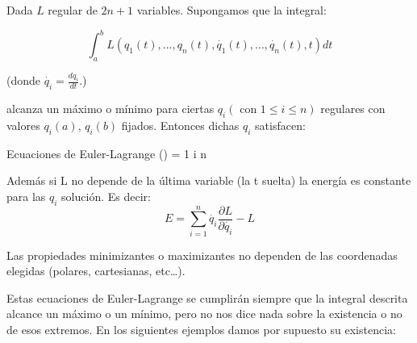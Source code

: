 \begin{prop}
Dada $L$ regular de $2n + 1$ variables. Supongamos que la integral:

 $$\int_a^b L(q_1(t),...,q_n(t),\dot{q_1}(t),...,\dot{q_n}(t),t) dt$$

 (donde $\dot{q_i} = \frac{dq_i}{dt}$.)

 alcanza un máximo o mínimo para ciertas $q_i (\text{ con } 1\leq i \leq n)$ regulares con valores $q_i(a)$, $q_i(b)$ fijados. Entonces dichas $q_i$ satisfacen:


\begin{op}{Ecuaciones de Euler-Lagrange}
	\label{ecuaciones-euler-lagrange}
 \left(\right) =   1 \leq i \leq n
\end{op}

Además si L no depende de la última variable (la t suelta) la energía es constante para las $q_i$ solución. Es decir:
\[E = \sum_{i=1}^n \dot{q_i} \frac{\partial L}{\partial \dot{q_i}} - L\]

Las propiedades minimizantes o maximizantes no dependen de las coordenadas elegidas (polares, cartesianas, etc…).

\end{prop}

Estas ecuaciones de Euler-Lagrange se cumplirán siempre que la integral descrita alcance un máximo o un mínimo, pero no nos dice nada sobre la existencia o no de esos extremos. En los  siguientes ejemplos damos por supuesto su existencia:

